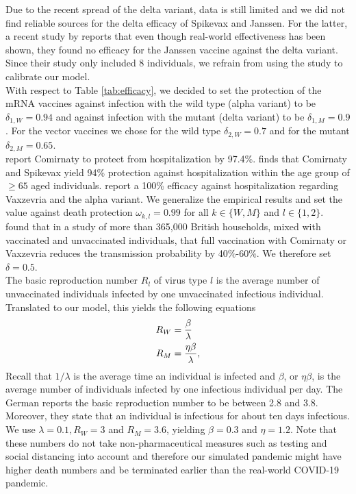 Due to the recent spread of the delta variant, data is still limited and we did not find reliable sources for the delta efficacy of Spikevax and Janssen. For the latter, a recent study by \cite{Jongeneelen.2021} reports that even though real-world effectiveness has been shown, they found no efficacy for the Janssen vaccine against the delta variant. Since their study only included 8 individuals, we refrain from using the study to calibrate our model. \\

With respect to Table \ref{tab:efficacy}, we decided to set the protection of the mRNA vaccines against infection with the wild type (alpha variant) to be $\delta_{1, W} = 0.94$ and against infection with the mutant (delta variant) to be $\delta_{1, M} = 0.9$. For the vector vaccines we chose for the wild type $\delta_{2, W} = 0.7$ and for the mutant $\delta_{2, M} = 0.65$.\\

\cite{Abu.2021} report Comirnaty to protect from hospitalization by 97.4\%. \cite{Tenforde.2021} finds that Comirnaty and Spikevax yield 94\% protection against hospitalization within the age group of $\geq 65$ aged individuals. \cite{Voysey.2021} report a 100\% efficacy against hospitalization regarding Vaxzevria and the alpha variant. We generalize the empirical results and set the value against death protection $\omega_{k,l} = 0.99$ for all $k \in \{W,M\}$ and $l \in \{1,2\}$.\\

\cite{Harris.2021} found that in a study of more than 365,000 British households, mixed with vaccinated and unvaccinated individuals, that full vaccination with Comirnaty or Vaxzevria reduces the transmission probability by 40\%-60\%. We therefore set $\delta = 0.5$. \\

The basic reproduction number $R_l$ of virus type $l$ is the average number of unvaccinated individuals infected by one unvaccinated infectious individual. Translated to our model, this yields the following equations 
\begin{align}
R_W &= \frac{\beta}{\lambda} \\
R_M &= \frac{\eta \beta}{\lambda}, \notag
\end{align}
Recall that $1/\lambda$ is the average time an individual is infected and $\beta$, or $\eta \beta$, is the average number of individuals infected by one infectious individual per day. The German \cite{RKI.2021} reports the basic reproduction number to be between 2.8 and 3.8. Moreover, they state that an individual is infectious for about ten days infectious. We use $\lambda = 0.1, R_W = 3$ and $R_M = 3.6$, yielding $\beta = 0.3$ and $\eta = 1.2$. Note that these numbers do not take non-pharmaceutical measures such as testing and social distancing into account and therefore our simulated pandemic might have higher death numbers and be terminated earlier than the real-world COVID-19 pandemic. \\%

